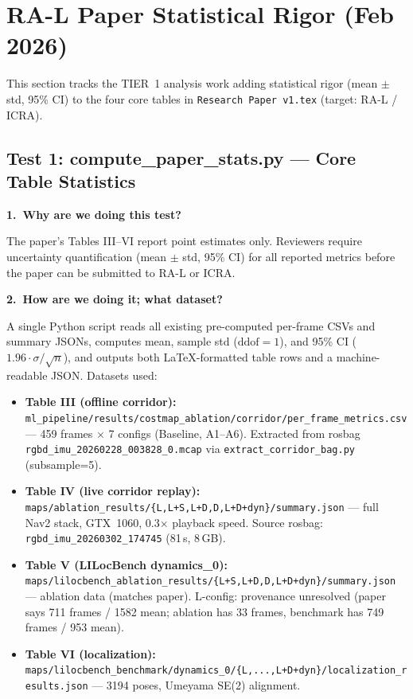 \documentclass[11pt,a4paper]{article}
\begin{document}
\section{RA-L Paper Statistical Rigor (Feb 2026)}
\label{sec:ral-stats}

This section tracks the TIER~1 analysis work adding statistical rigor
(mean $\pm$ std, 95\% CI) to the four core tables in
\texttt{Research Paper v1.tex} (target: RA-L / ICRA).

\subsection{Test 1: compute\_paper\_stats.py --- Core Table Statistics}
\label{sec:test-compute-paper-stats}

\textbf{1.\ Why are we doing this test?}

The paper's Tables III--VI report point estimates only. Reviewers require
uncertainty quantification (mean $\pm$ std, 95\% CI) for all reported
metrics before the paper can be submitted to RA-L or ICRA.

\textbf{2.\ How are we doing it; what dataset?}

A single Python script reads all existing pre-computed per-frame CSVs and
summary JSONs, computes mean, sample std ($\text{ddof}=1$), and 95\% CI
($1.96 \cdot \sigma / \sqrt{n}$), and outputs both LaTeX-formatted table
rows and a machine-readable JSON. Datasets used:

\begin{itemize}[nosep]
  \item \textbf{Table III (offline corridor):}
    \texttt{ml\_pipeline/results/costmap\_ablation/corridor/per\_frame\_metrics.csv}
    --- 459 frames $\times$ 7 configs (Baseline, A1--A6).
    Extracted from rosbag \texttt{rgbd\_imu\_20260228\_003828\_0.mcap}
    via \texttt{extract\_corridor\_bag.py} (subsample=5).
  \item \textbf{Table IV (live corridor replay):}
    \texttt{maps/ablation\_results/\{L,L+S,L+D,D,L+D+dyn\}/summary.json}
    --- full Nav2 stack, GTX~1060, 0.3$\times$ playback speed.
    Source rosbag: \texttt{rgbd\_imu\_20260302\_174745} (81\,s, 8\,GB).
  \item \textbf{Table V (LILocBench dynamics\_0):}
    \texttt{maps/lilocbench\_ablation\_results/\{L+S,L+D,D,L+D+dyn\}/summary.json}
    --- ablation data (matches paper). L-config: provenance unresolved
    (paper says 711 frames / 1582 mean; ablation has 33 frames,
    benchmark has 749 frames / 953 mean).
  \item \textbf{Table VI (localization):}
    \texttt{maps/lilocbench\_benchmark/dynamics\_0/\{L,...,L+D+dyn\}/localization\_results.json}
    --- 3194 poses, Umeyama SE(2) alignment.
\end{itemize}
\end{document}
